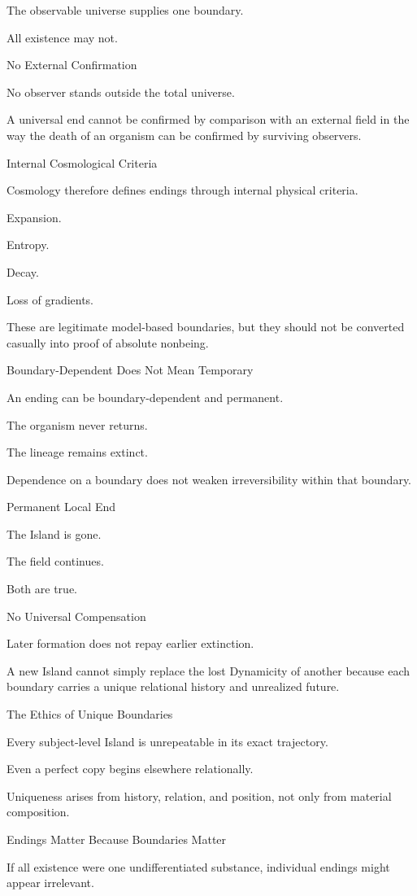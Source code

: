 The observable universe supplies one boundary.

All existence may not.

No External Confirmation

No observer stands outside the total universe.

A universal end cannot be confirmed by comparison with an external field in the way the death of an organism can be confirmed by surviving observers.

Internal Cosmological Criteria

Cosmology therefore defines endings through internal physical criteria.

Expansion.

Entropy.

Decay.

Loss of gradients.

These are legitimate model-based boundaries, but they should not be converted casually into proof of absolute nonbeing.

Boundary-Dependent Does Not Mean Temporary

An ending can be boundary-dependent and permanent.

The organism never returns.

The lineage remains extinct.

Dependence on a boundary does not weaken irreversibility within that boundary.

Permanent Local End

The Island is gone.

The field continues.

Both are true.

No Universal Compensation

Later formation does not repay earlier extinction.

A new Island cannot simply replace the lost Dynamicity of another because each boundary carries a unique relational history and unrealized future.

The Ethics of Unique Boundaries

Every subject-level Island is unrepeatable in its exact trajectory.

Even a perfect copy begins elsewhere relationally.

Uniqueness arises from history, relation, and position, not only from material composition.

Endings Matter Because Boundaries Matter

If all existence were one undifferentiated substance, individual endings might appear irrelevant.

